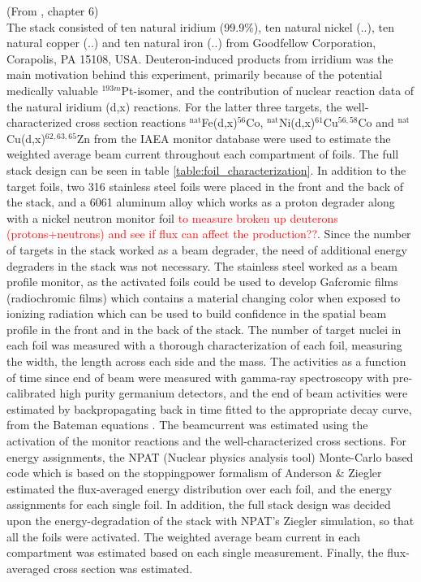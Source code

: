 (From \cite{KraneKennethS.Halliday1987}, chapter 6) \\


\noindent
 The stack consisted of ten natural iridium (99.9\%), ten natural nickel (..), ten natural copper (..) and ten natural iron (..) from Goodfellow Corporation, Corapolis, PA 15108, USA. Deuteron-induced products from irridium was the main motivation behind this experiment, primarily because of the potential medically valuable $^{193m}$Pt-isomer, and the contribution of nuclear reaction data of the natural iridium (d,x) reactions. For the latter three targets, the well-characterized cross section reactions $^\text{nat}$Fe(d,x)$^{56}$Co, $^\text{nat}$Ni(d,x)$^{61}$Cu$^{56,58}$Co and $^\text{nat}$Cu(d,x)$^{62,63,65}$Zn from the IAEA monitor database\cite{Hermanne2018a} were used to estimate the weighted average beam current throughout each compartment of foils. The full stack design can be seen in table \ref{table:foil_characterization}. In addition to the target foils, two 316 stainless steel foils were placed in the front and the back of the stack, and a 6061 aluminum alloy which works as a proton degrader along with a nickel neutron monitor foil \textcolor{red}{to measure broken up deuterons (protons+neutrons) and see if flux can affect the production??}. Since the number of targets in the stack worked as a beam degrader, the need of additional energy degraders in the stack was not necessary. The stainless steel worked as a beam profile monitor, as the activated foils could be used to develop Gafcromic films (radiochromic films) which contains a material changing color when exposed to ionizing radiation which can be used to build confidence in the spatial beam profile in the front and in the back of the stack. The number of target nuclei in each foil was measured with a thorough characterization of each foil, measuring the width, the length across each side and the mass. The activities as a function of time since end of beam were measured with gamma-ray spectroscopy with pre-calibrated high purity germanium detectors, and the end of beam activities were estimated by backpropagating back in time fitted to the appropriate decay curve, from the Bateman equations \cite{PopO.M.SimulikV.M.2016}. The beamcurrent was estimated using the activation of the monitor reactions and the well-characterized cross sections. For energy assignments, the NPAT (Nuclear physics analysis tool) Monte-Carlo based code which is based on the stoppingpower formalism of Anderson \& Ziegler \cite{MorellJ., Ziegler1999} estimated the flux-averaged energy distribution over each foil, and the energy assignments for each single foil. In addition, the full stack design was decided upon the energy-degradation of the stack with NPAT's Ziegler simulation, so that all the foils were activated. The weighted average beam current in each compartment was estimated based on each single measurement. Finally, the flux-averaged cross section was estimated. \\

